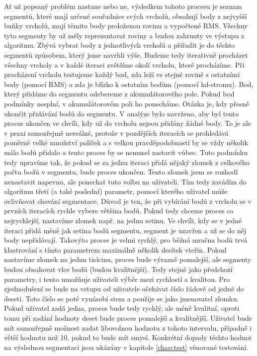 \documentclass[11pt,twoside,a4paper]{book}
\begin{document}
Ať už popsaný problém nastane nebo ne, výsledkem tohoto procesu je seznam segmentů, které mají určené souřadnice svých vrcholů, obsahují body z nejvyšší buňky vrcholů, mají těmito body proloženou rovinu a vypočtené RMS. Všechny tyto segmenty by už měly reprezentovat roviny a budou zahrnuty ve výstupu z algoritmu. Zbývá vybrat body z jednotlivých vrcholů a přiřadit je do těchto segmentů způsobem, který jsme navrhli výše. Budeme tedy iterativně procházet všechny vrcholy a v každé iteraci zvětšíme okolí vrcholu, které procházíme. Při procházení vrcholu testujeme každý bod, zda leží ve stejné rovině s ostatními body (pomocí RMS) a zda je blízko k ostatním bodům (pomocí kd-stromu). Bod, který přidáme do segmentu odebereme z akumulátorového pole. Pokud bod podmínky nesplní, v akumulátorovém poli ho ponecháme. Otázka je, kdy přesně ukončit přidávání bodů do segmentu. V analýze bylo navrženo, aby byl tento proces ukončen ve chvíli, kdy už do vrcholu nejsou přidány žádné body. To je ale v praxi samozřejmě nereálné, protože v pozdějších iteracích se prohledává poměrně velké množství políček a s velkou pravděpodobností by se vždy několik málo bodů přidalo a tento proces by se nemusel zastavit vůbec. Tuto podmínku tedy upravíme tak, že pokud se za jednu iteraci přidá nějaký zlomek z celkového počtu bodů v segmentu, bude proces ukončen. Tento zlomek jsem se rozhodl nenastavit napevno, ale ponechat tuto volbu na uživateli. Tím tedy zavádím do algoritmu třetí (a také poslední) parametr, pomocí kterého uživatel může ovlivňovat chování segmentace. Důvod je ten, že při vybírání bodů z vrcholu se v prvních iteracích rychle vybere většina bodů. Pokud tedy chceme proces co nejrychlejší, nastavíme zlomek např. na jednu setinu. Ve chvíli, kdy se v jedné iteraci přidá méně jak setina bodů segmentu, segment je uzavřen a už se do něj body nepřidávají. Takovýto proces je velmi rychlý, pro běžná mračna bodů trvá klastrování s tímto parametrem maximálně několik desítek vteřin. Pokud nastavíme zlomek na jednu tisícinu, proces bude výrazně pomalejší, ale segmenty budou obsahovat více bodů (budou kvalitnější). Tedy stejně jako předchozí parametry, i tento umožňuje uživateli výběr mezi rychlostí a kvalitou. Pro zjednodušení se bude na vstupu od uživatele očekávat číslo řádově od jedné do deseti. Toto číslo se poté vynásobí stem a použije se jako jmenovatel zlomku. Pokud uživatel zadá jedna, proces bude tedy rychlý, ale méně kvalitní, oproti tomu při zadání hodnoty deset bude proces pomalejší a kvalitnější. Uživatel bude mít samozřejmě možnost zadat libovolnou hodnotu z tohoto intervalu, případně i větší hodnotu než 10, pokud to bude mít smysl. Konkrétní dopady těchto hodnot na výslednou segmentaci jsou ukázány v kapitole \ref{chap:test} věnované testování. 
\end{document}
